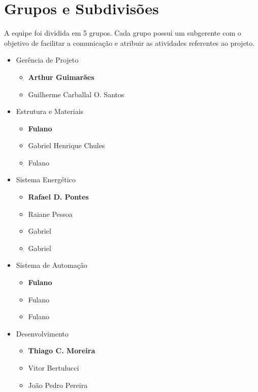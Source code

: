     \section{Grupos e Subdivisões}
        \par A equipe foi dividida em 5 grupos. Cada grupo possui um subgerente com o objetivo de facilitar a comunicação e atribuir as atividades referentes ao projeto.
        \begin{itemize}
            \item Gerência de Projeto
                \begin{itemize}
                    \item \textbf{Arthur Guimarães}
                    \item Guilherme Carballal O. Santos
                \end{itemize}
            \item Estrutura e Materiais
                \begin{itemize}
                    \item \textbf{Fulano}
                    \item Gabriel Henrique Chules
                    \item Fulano
                \end{itemize}
            \item Sistema Energético
                \begin{itemize}
                    \item \textbf{Rafael D. Pontes}
                    \item Raiane Pessoa
                    \item Gabriel
                    \item Gabriel
                \end{itemize}
            \item Sistema de Automação
                \begin{itemize}
                    \item \textbf{Fulano}
                    \item Fulano
                    \item Fulano
                \end{itemize}
            \item Desenvolvimento
                \begin{itemize}
                    \item \textbf{Thiago C. Moreira}
                    \item Vitor Bertulucci
                    \item João Pedro Pereira
                \end{itemize}
        \end{itemize}
